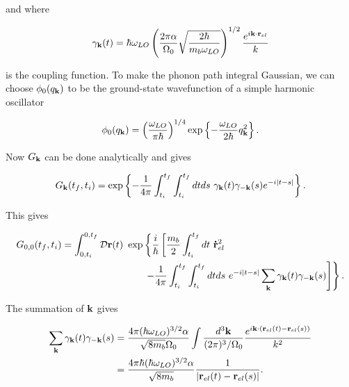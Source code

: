 and where

\begin{equation}
    \gamma_{\vb{k}}(t) = \hbar \omega_{LO} \left(\frac{2 \pi \alpha}{\Omega_0} \sqrt{\frac{2 \hbar}{m_b \omega_{LO}}}\right)^{1/2} \frac{e^{i \vb{k} \cdot \vb{r}_{el}}}{k}
\end{equation}

is the coupling function. To make the phonon path integral Gaussian, we can choose $\phi_0(q_{\vb{k}})$ to be the ground-state wavefunction of a simple harmonic oscillator

\begin{equation}
    \phi_0(q_{\vb{k}}) = \left(\frac{\omega_{LO}}{\pi\hbar}\right)^{1/4} \exp \left\{-\frac{\omega_{LO}}{2\hbar} q_{\vb{k}}^2\right\}.
\end{equation}

Now $G_{\vb{k}}$ can be done analytically and gives

\begin{equation}
    G_{\vb{k}}(t_f, t_i) = \exp \left\{ -\frac{1}{4\pi} \int_{t_i}^{t_f} \int_{t_i}^{t_f} dt ds\ \gamma_{\vb{k}}(t) \gamma_{\vb{-k}}(s) e^{-i\abs{t-s}} \right\}.
\end{equation}

This gives

\begin{equation}
\begin{aligned}
    G_{0,0}(t_f, t_i) = \int^{0, t_f}_{0, t_i} \mathcal{D}\vb{r}(t)\ \exp&\left\{ \frac{i}{\hbar} \left[  \frac{m_b}{2} \int^{t_f}_{t_i} dt\ \vb{\dot{r}}_{el}^2 \right.\right. \\
    &\left.\left.-\frac{1}{4\pi} \int_{t_i}^{t_f} \int_{t_i}^{t_f} dt ds\ e^{-i\abs{t-s}} \sum_{\vb{k}} \gamma_{\vb{k}}(t) \gamma_{\vb{-k}}(s) \right] \right\}.
\end{aligned}
\end{equation}

The summation of $\vb{k}$ gives

\begin{equation}
\begin{aligned}
    \sum_{\vb{k}} \gamma_{\vb{k}}(t) \gamma_{\vb{-k}}(s) &= \frac{4\pi(\hbar \omega_{LO})^{3/2} \alpha}{\sqrt{8 m_b} \Omega_0} \int \frac{d^3\vb{k}}{(2\pi)^3/\Omega_0} \frac{e^{i\vb{k}\cdot \left(\vb{r}_{el}(t) - \vb{r}_{el}(s) \right)}}{k^2} \\
    &= \frac{4\pi\hbar(\hbar \omega_{LO})^{3/2} \alpha}{\sqrt{8 m_b}} \frac{1}{\abs{\vb{r}_{el}(t) - \vb{r}_{el}(s)}}.
\end{aligned}
\end{equation}

